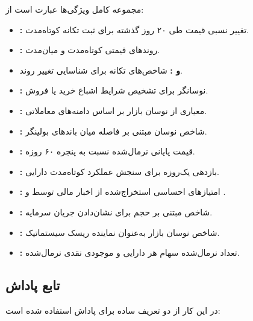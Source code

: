 \documentclass[12pt, a4paper]{report}
\begin{document}
مجموعه کامل ویژگی‌ها عبارت است از:
\begin{itemize}
    \item \textbf{:} تغییر نسبی قیمت طی ۲۰ روز گذشته برای ثبت تکانه کوتاه‌مدت.  
    \item \textbf{:} روندهای قیمتی کوتاه‌مدت و میان‌مدت.  
    \item \textbf{ و :} شاخص‌های تکانه برای شناسایی تغییر روند.  
    \item \textbf{:} نوسانگر برای تشخیص شرایط اشباع خرید یا فروش.  
    \item \textbf{:} معیاری از نوسان بازار بر اساس دامنه‌های معاملاتی.  
    \item \textbf{:} شاخص نوسان مبتنی بر فاصله میان باندهای بولینگر.  
    \item \textbf{:} قیمت پایانی نرمال‌شده نسبت به پنجره ۶۰ روزه.  
    \item \textbf{:} بازدهی یک‌روزه برای سنجش عملکرد کوتاه‌مدت دارایی.  
    \item \textbf{:} امتیازهای احساسی استخراج‌شده از اخبار مالی توسط  و .  
    \item \textbf{:} شاخص مبتنی بر حجم برای نشان‌دادن جریان سرمایه.  
    \item \textbf{:} شاخص نوسان بازار به‌عنوان نماینده ریسک سیستماتیک.  
    \item \textbf{:} تعداد نرمال‌شده سهام هر دارایی و موجودی نقدی نرمال‌شده.  
\end{itemize}


\subsection{تابع پاداش}
در این کار از دو تعریف ساده برای پاداش استفاده شده است:
\end{document}
